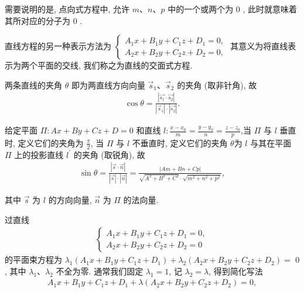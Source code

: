 需要说明的是, 点向式方程中, 允许 $m 、 n 、 p$ 中的一个或两个为 0 , 此时就意味着其所对应的分子为 0 .

直线方程的另一种表示方法为 $\left\{\begin{array}{l}A_1 x+B_1 y+C_1 z+D_1=0, \\ A_2 x+B_2 y+C_2 z+D_2=0,\end{array}\right.$ 其意义为将直线表示为两个平面的交线, 我们称之为直线的交面式方程.

两条直线的夹角 $\theta$ 即为两直线方向向量 $\vec{s}_1 、 \vec{s}_2$ 的夹角 (取非针角), 故
\begin{align*}
	\cos \theta=\frac{\left|\overrightarrow{s_1} \cdot \overrightarrow{s_2}\right|}{\left|\vec{s}_1\right| \cdot\left|\overrightarrow{s_2}\right|} .
\end{align*}

给定平面 $\Pi: A x+B y+C z+D=0$ 和直线 $l: \frac{x-x_0}{m}=\frac{y-y_0}{n}=\frac{z-z_0}{p}$,当 $\Pi$ 与 $l$ 垂直时, 定义它们的夹角为 $\frac{\pi}{2}$, 当 $\Pi$ 与 $l$ 不垂直时, 定义它们的夹角 $\theta$为 $l$ 与其在平面 $\Pi$ 上的投影直线 $l^{\prime}$ 的夹角 (取锐角), 故
\begin{align*}
	\sin \theta=\frac{|\vec{s} \cdot \vec{n}|}{|\vec{s}| \cdot|\vec{n}|}=\frac{|A m+B n+C p|}{\sqrt{A^2+B^2+C^2} \cdot \sqrt{m^2+n^2+p^2}},
\end{align*}

其中 $\vec{s}$ 为 $l$ 的方向向量, $\vec{n}$ 为 $\Pi$ 的法向量.

过直线
\begin{align*}
	\left\{\begin{array}{l}
		       A_1 x+B_1 y+C_1 z+D_1=0, \\
		       A_2 x+B_2 y+C_2 z+D_2=0
	       \end{array}\right.
\end{align*}
的平面束方程为 $\lambda_1\left(A_1 x+B_1 y+C_1 z+D_1\right)+\lambda_2\left(A_2 x+B_2 y+C_2 z+D_2\right)=$ 0 , 其中 $\lambda_1 、 \lambda_2$ 不全为零. 通常我们固定 $\lambda_1=1$, 记 $\lambda_2=\lambda$, 得到简化写法
\begin{align*}
	A_1 x+B_1 y+C_1 z+D_1+\lambda\left(A_2 x+B_2 y+C_2 z+D_2\right)=0,
\end{align*}

